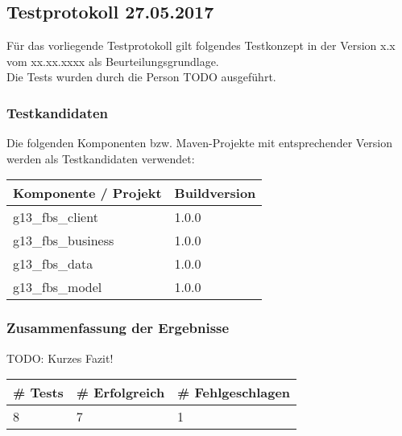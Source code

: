 \subsection{Testprotokoll 27.05.2017}
Für das vorliegende Testprotokoll gilt folgendes Testkonzept in der Version x.x vom xx.xx.xxxx als Beurteilungsgrundlage. \\
Die Tests wurden durch die Person TODO ausgeführt.
\subsubsection{Testkandidaten}
Die folgenden Komponenten bzw. Maven-Projekte mit entsprechender Version werden als Testkandidaten verwendet:\\
\begin{tabular}{|l|l|}
	\hline \rowcolor{gray!50}
	\textbf{Komponente / Projekt} & \textbf{Buildversion} \\ 
	\hline 
	g13\_fbs\_client & 1.0.0 \\ 
	\hline 
	g13\_fbs\_business & 1.0.0 \\ 
	\hline 
	g13\_fbs\_data & 1.0.0 \\ 
	\hline 
	g13\_fbs\_model & 1.0.0 \\ 
	\hline 
\end{tabular} 

\subsubsection{Zusammenfassung der Ergebnisse}
TODO: Kurzes Fazit! \\
\begin{tabular}{|l|l|l|}
	\hline \rowcolor{gray!50}
	\textbf{\# Tests} & \textbf{\# Erfolgreich} & \textbf{\# Fehlgeschlagen} \\ 
	\hline 
	8 & 7 & 1 \\ 
	\hline 
\end{tabular} 

